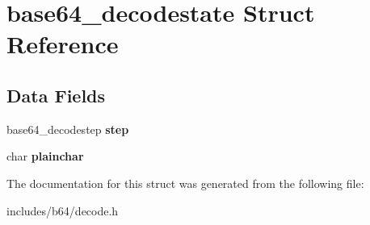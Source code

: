 \hypertarget{structbase64_1_1base64__decodestate}{\section{base64\-\_\-decodestate Struct Reference}
\label{structbase64_1_1base64__decodestate}
}
\subsection*{Data Fields}
\begin{DoxyCompactItemize}
\item 
\hypertarget{structbase64_1_1base64__decodestate_a448927d59479ddab147ed380104d2cbe}{base64\-\_\-decodestep {\bfseries step}}\label{structbase64_1_1base64__decodestate_a448927d59479ddab147ed380104d2cbe}

\item 
\hypertarget{structbase64_1_1base64__decodestate_ad1b3e9f303925389dcd09100288913d4}{char {\bfseries plainchar}}\label{structbase64_1_1base64__decodestate_ad1b3e9f303925389dcd09100288913d4}

\end{DoxyCompactItemize}


The documentation for this struct was generated from the following file\-:\begin{DoxyCompactItemize}
\item 
includes/b64/decode.\-h\end{DoxyCompactItemize}
